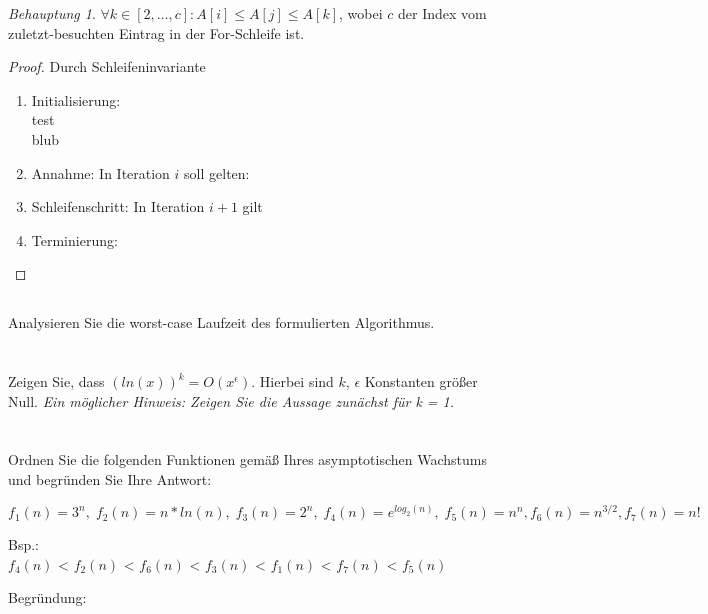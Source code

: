 \documentclass[12pt]{article}
\theoremstyle{remark}
\newtheorem*{Behauptung}{Behauptung}
\begin{document}
\begin{Behauptung}
$\forall k \in [2, \ldots, c]: A[i] \leq A[j] \leq A[k]$, wobei $c$ der Index vom zuletzt-besuchten Eintrag in der For-Schleife ist.
\end{Behauptung}

\begin{proof}
Durch Schleifeninvariante
\begin{enumerate}
    \item Initialisierung: \\
    test \\
     blub
    \item Annahme: In Iteration $i$ soll gelten: 
    \item Schleifenschritt:
    In Iteration $i + 1$ gilt 
    \item Terminierung: 
\end{enumerate}
\end{proof}
\subsection{} Analysieren Sie die worst-case Laufzeit des formulierten Algorithmus.

\newpage
\section{}

Zeigen Sie, dass $(ln(x))^k = O(x^\epsilon).$ Hierbei sind $k$, $\epsilon$ Konstanten größer Null. {\it Ein möglicher Hinweis: Zeigen Sie die Aussage zunächst für k = 1.}

\section{}

Ordnen Sie die folgenden Funktionen gemäß Ihres asymptotischen Wachstums und begründen Sie Ihre Antwort:

\[
f_1(n) = 3^n, \; f_2(n) = n*ln(n), \; f_3(n) = 2^n, \; f_4(n) = e^{log_2(n)}, \; f_5(n) = n^n, f_6(n) = n^{3/2}, f_7(n) = n!
\]

Bsp.: \\
$f_4(n)$ < $f_2(n)$ < $f_6(n)$ < $f_3(n)$ < $f_1(n)$ < $f_7(n)$ < $f_5(n)$

Begründung: \\
\end{document}
